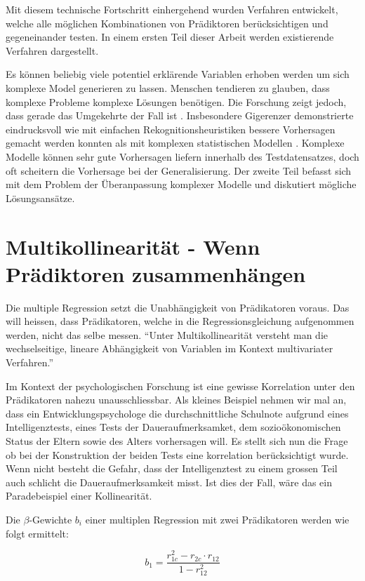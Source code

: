\documentclass[english,12pt,doc]{apa}
\begin{document}
Mit diesem technische Fortschritt einhergehend wurden Verfahren entwickelt, welche alle möglichen Kombinationen von Prädiktoren berücksichtigen und gegeneinander testen. In einem ersten Teil dieser Arbeit werden existierende Verfahren dargestellt. 

Es können beliebig viele potentiel erklärende Variablen erhoben werden um sich komplexe Model generieren zu lassen. Menschen tendieren zu glauben, dass komplexe Probleme komplexe Lösungen benötigen. Die Forschung zeigt jedoch, dass gerade das Umgekehrte der Fall ist \cite[p.3]{armstrong2011illusions}. 
Insbesondere Gigerenzer demonstrierte eindrucksvoll wie mit einfachen Rekognitionsheuristiken bessere Vorhersagen gemacht werden konnten als mit komplexen statistischen Modellen \cite{borges1999can}. Komplexe Modelle können sehr gute Vorhersagen liefern innerhalb des Testdatensatzes, doch oft scheitern die Vorhersage bei der Generalisierung. Der zweite Teil befasst sich mit dem Problem der Überanpassung komplexer Modelle und diskutiert mögliche Lösungsansätze.

\section{Multikollinearität -  Wenn Prädiktoren zusammenhängen}
Die multiple Regression setzt die Unabhängigkeit von Prädikatoren voraus. Das will heissen, dass Prädikatoren, welche in die Regressionsgleichung aufgenommen werden, nicht das selbe messen. ``Unter Multikollinearität versteht man die wechselseitige, lineare Abhängigkeit von Variablen im Kontext multivariater Verfahren.'' \cite[p. 453]{bortz2011}

Im Kontext der psychologischen Forschung ist eine gewisse Korrelation unter den Prädikatoren nahezu unausschliessbar. Als kleines Beispiel nehmen wir mal an, dass ein Entwicklungspsychologe die durchschnittliche Schulnote aufgrund eines Intelligenztests, eines Tests der Daueraufmerksamket, dem sozioökonomischen Status der Eltern sowie des Alters vorhersagen will. Es stellt sich nun die Frage ob bei der Konstruktion der beiden Tests eine korrelation berücksichtigt wurde. Wenn nicht besteht die Gefahr, dass der Intelligenztest zu einem grossen Teil auch schlicht die Daueraufmerksamkeit misst. Ist dies der Fall, wäre das ein Paradebeispiel einer Kollinearität.

Die $\beta$-Gewichte $b_i$ einer multiplen Regression mit zwei Prädikatoren werden wie folgt ermittelt:

\begin{equation}
b_1 = \frac{r_{1c}^2 - r_{2c}\cdot r_{12}}{1-r_{12}^2}
\label{eq:beta1}
\end{equation}
\end{document}
